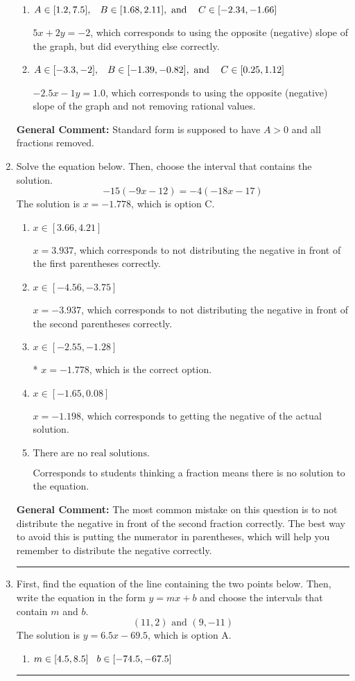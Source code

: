 \documentclass{extbook}[14pt]
\newcommand{\litem}[1]{\item #1

\rule{\textwidth}{0.4pt}}
\begin{document}
\begin{enumerate}
{\begin{enumerate}[label=\Alph*.]
 $-2.5x + 1y = -1.0$, which corresponds to not removing rational values for Standard Form.
\item \( A \in [1.2, 7.5], \hspace{3mm} B \in [1.68, 2.11], \text{ and } \hspace{3mm} C \in [-2.34, -1.66] \)

 $5x + 2y = -2$, which corresponds to using the opposite (negative) slope of the graph, but did everything else correctly.
\item \( A \in [-3.3, -2], \hspace{3mm} B \in [-1.39, -0.82], \text{ and } \hspace{3mm} C \in [0.25, 1.12] \)

 $-2.5x - 1y = 1.0$, which corresponds to using the opposite (negative) slope of the graph and not removing rational values.
\end{enumerate}

\textbf{General Comment:} Standard form is supposed to have $A > 0$ and all fractions removed.
}
\litem{
Solve the equation below. Then, choose the interval that contains the solution.
\[ -15(-9x -12) = -4(-18x -17) \]The solution is \( x = -1.778 \), which is option C.\begin{enumerate}[label=\Alph*.]
\item \( x \in [3.66, 4.21] \)

$x = 3.937$, which corresponds to not distributing the negative in front of the first parentheses correctly.
\item \( x \in [-4.56, -3.75] \)

$x = -3.937$, which corresponds to not distributing the negative in front of the second parentheses correctly.
\item \( x \in [-2.55, -1.28] \)

* $x = -1.778$, which is the correct option.
\item \( x \in [-1.65, 0.08] \)

$x = -1.198$, which corresponds to getting the negative of the actual solution.
\item \( \text{There are no real solutions.} \)

Corresponds to students thinking a fraction means there is no solution to the equation.
\end{enumerate}

\textbf{General Comment:} The most common mistake on this question is to not distribute the negative in front of the second fraction correctly. The best way to avoid this is putting the numerator in parentheses, which will help you remember to distribute the negative correctly.
}
\litem{
First, find the equation of the line containing the two points below. Then, write the equation in the form $ y=mx+b $ and choose the intervals that contain $m$ and $b$.
\[ (11, 2) \text{ and } (9, -11) \]The solution is \( y = 6.5x -69.5 \), which is option A.\begin{enumerate}[label=\Alph*.]
\item \( m \in [4.5, 8.5] \hspace*{3mm} b \in [-74.5, -67.5] \)


\end{enumerate}}
\end{enumerate}
\end{document}
